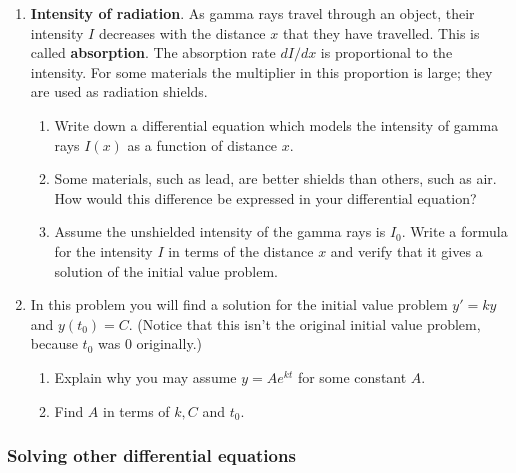 \begin{enumerate}
\begin{enumerate}
\end{enumerate}
\item {\bf Intensity of radiation}. As gamma rays
travel through an object, their intensity $I$ decreases with the
distance $x$ that they have travelled.  This is called {\bf
  absorption}.  The absorption rate $dI/dx$ is proportional to the
intensity.  For some materials the multiplier in this proportion is
large; they are used as radiation shields.

  \begin{enumerate}
  \item Write down a differential equation which models the intensity of
gamma rays $I(x)$ as a function of distance $x$.

  \item Some materials, such as lead, are better shields than others,
such as air.  How would this difference be expressed in your
differential equation?

  \item Assume the unshielded intensity of the gamma rays is $I_0$.
Write a formula for the intensity $I$ in terms of the distance $x$ and
verify that it gives a solution of the initial value problem.



\end{enumerate}
\item In this problem you will find a solution for the initial value problem $y'=ky$ and $y(t_0)=C$.  (Notice that this isn't the original initial value problem, because $t_0$ was 0 originally.)


  \begin{enumerate}
  \item Explain why you may assume $y=Ae^{kt}$ for some constant $A$.

  \item Find $A$ in terms of $k, C$ and $t_0$.


\end{enumerate}
\end{enumerate}
\subsubsection{Solving other differential equations}
\label{subsubsec:solving-other-differential-equations}



